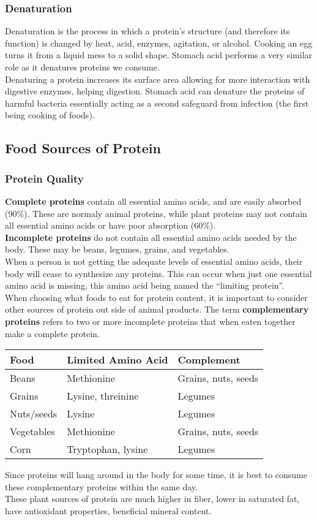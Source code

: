 \documentclass[letterpaper, 11pt]{article}
\begin{document}
\subsubsection{Denaturation}
\label{sec:org6af98d7}
Denaturation is the process in which a protein's structure (and therefore its function) is changed by heat, acid, enzymes, agitation, or alcohol. Cooking an egg turns it from a liquid mess to a solid shape. Stomach acid performs a very similar role as it denatures proteins we consume.\\
Denaturing a protein increases its surface area allowing for more interaction with digestive enzymes, helping digestion. Stomach acid can denature the proteins of harmful bacteria essentially acting as a second safeguard from infection (the first being cooking of foods).\\
\subsection{Food Sources of Protein}
\label{sec:orgfed4af7}
\subsubsection{Protein Quality}
\label{sec:org6ec2e1e}
\textbf{Complete proteins} contain all essential amino acids, and are easily absorbed (90\%). These are normaly animal proteins, while plant proteins may not contain all essential amino acids or have poor absorption (60\%).\\
\textbf{Incomplete proteins} do not contain all essential amino acids needed by the body. These may be beans, legumes, grains, and vegetables.\\
When a person is not getting the adequate levels of essential amino acids, their body will cease to synthesize any proteins. This can occur when just one essential amino acid is missing, this amino acid being named the ``limiting protein''.\\
When choosing what foods to eat for protein content, it is important to consider other sources of protein out side of animal products. The term \textbf{complementary proteins} refers to two or more incomplete proteins that when eaten together make a complete protein.\\
\begin{center}
\begin{tabular}{lll}
Food & Limited Amino Acid & Complement\\
\hline
Beans & Methionine & Grains, nuts, seeds\\
Grains & Lysine, threinine & Legumes\\
Nuts/seeds & Lysine & Legumes\\
Vegetables & Methionine & Grains, nuts, seeds\\
Corn & Tryptophan, lysine & Legumes\\
\end{tabular}
\end{center}
Since proteins will hang around in the body for some time, it is best to consume these complementary proteins within the same day.\\
These plant sources of protein are much higher in fiber, lower in saturated fat, have antioxidant properties, beneficial mineral content.\\
\end{document}
